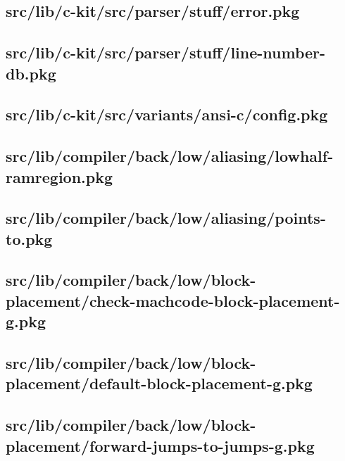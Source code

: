 \subsection{src/lib/c-kit/src/parser/stuff/error.pkg}


\subsection{src/lib/c-kit/src/parser/stuff/line-number-db.pkg}


\subsection{src/lib/c-kit/src/variants/ansi-c/config.pkg}


\subsection{src/lib/compiler/back/low/aliasing/lowhalf-ramregion.pkg}


\subsection{src/lib/compiler/back/low/aliasing/points-to.pkg}


\subsection{src/lib/compiler/back/low/block-placement/check-machcode-block-placement-g.pkg}


\subsection{src/lib/compiler/back/low/block-placement/default-block-placement-g.pkg}


\subsection{src/lib/compiler/back/low/block-placement/forward-jumps-to-jumps-g.pkg}


